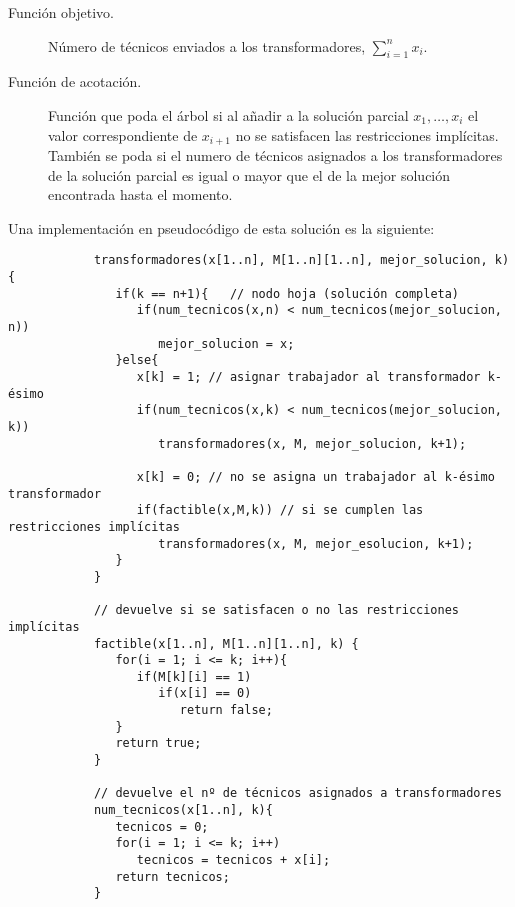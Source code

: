 \documentclass[12pt]{article}
\begin{document}
\begin{ejercicio}[2 puntos]
\begin{description}

            \item[Función objetivo.] Número de técnicos enviados a los transformadores, $\sum_{i=1}^n x_i$.
            \item [Función de acotación.] Función que poda el árbol si al añadir a la solución parcial $x_1,\ldots,x_i$ el valor correspondiente de $x_{i+1}$ no se satisfacen las restricciones implícitas. También se poda si el numero de técnicos asignados a los transformadores de la solución parcial es igual o mayor que el de la mejor solución encontrada hasta el momento.
        \end{description}
        Una implementación en pseudocódigo de esta solución es la siguiente:
        \begin{verbatim}
            transformadores(x[1..n], M[1..n][1..n], mejor_solucion, k){
               if(k == n+1){   // nodo hoja (solución completa)
                  if(num_tecnicos(x,n) < num_tecnicos(mejor_solucion, n))
                     mejor_solucion = x;
               }else{
                  x[k] = 1; // asignar trabajador al transformador k-ésimo
                  if(num_tecnicos(x,k) < num_tecnicos(mejor_solucion, k))
                     transformadores(x, M, mejor_solucion, k+1);

                  x[k] = 0; // no se asigna un trabajador al k-ésimo transformador
                  if(factible(x,M,k)) // si se cumplen las restricciones implícitas
                     transformadores(x, M, mejor_esolucion, k+1);
               }
            }

            // devuelve si se satisfacen o no las restricciones implícitas
            factible(x[1..n], M[1..n][1..n], k) {
               for(i = 1; i <= k; i++){
                  if(M[k][i] == 1)
                     if(x[i] == 0)
                        return false;
               }
               return true;
            }

            // devuelve el nº de técnicos asignados a transformadores
            num_tecnicos(x[1..n], k){
               tecnicos = 0;
               for(i = 1; i <= k; i++)
                  tecnicos = tecnicos + x[i];
               return tecnicos;
            }
        \end{verbatim}
    \end{ejercicio}
\end{document}
